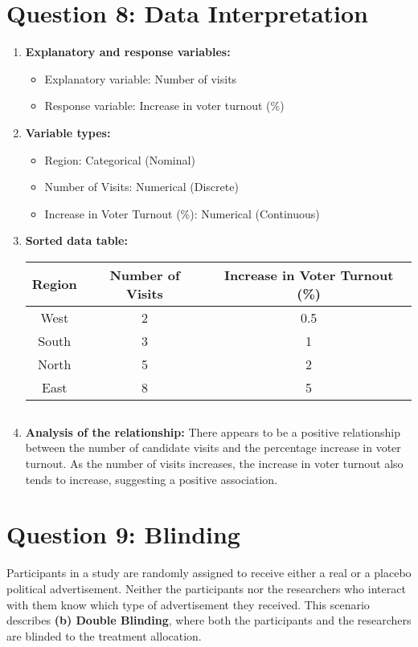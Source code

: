 \documentclass{article}
\begin{document}
\section*{Question 8: Data Interpretation}
\begin{enumerate}
    \item \textbf{Explanatory and response variables:}
    \begin{itemize}
        \item Explanatory variable: Number of visits
        \item Response variable: Increase in voter turnout (\%)
    \end{itemize}
    \item \textbf{Variable types:}
    \begin{itemize}
        \item Region: Categorical (Nominal)
        \item Number of Visits: Numerical (Discrete)
        \item Increase in Voter Turnout (\%): Numerical (Continuous)
    \end{itemize}
    \item \textbf{Sorted data table:}

\begin{center}
    \begin{tabular}{|c|c|c|}
    \hline
    Region & Number of Visits & Increase in Voter Turnout (\%) \\
    \hline
West & 2 & 0.5 \\
South & 3 & 1 \\
North & 5 & 2 \\
East & 8 & 5 \\
    \hline
    \end{tabular}
\end{center}


    \begin{verbatim}

    \end{verbatim}
    \item \textbf{Analysis of the relationship:}
    There appears to be a positive relationship between the number of candidate visits and the percentage increase in voter turnout. As the number of visits increases, the increase in voter turnout also tends to increase, suggesting a positive association.
\end{enumerate}

\section*{Question 9: Blinding}
Participants in a study are randomly assigned to receive either a real or a placebo political advertisement. Neither the participants nor the researchers who interact with them know which type of advertisement they received. This scenario describes \textbf{(b) Double Blinding}, where both the participants and the researchers are blinded to the treatment allocation.
\end{document}
